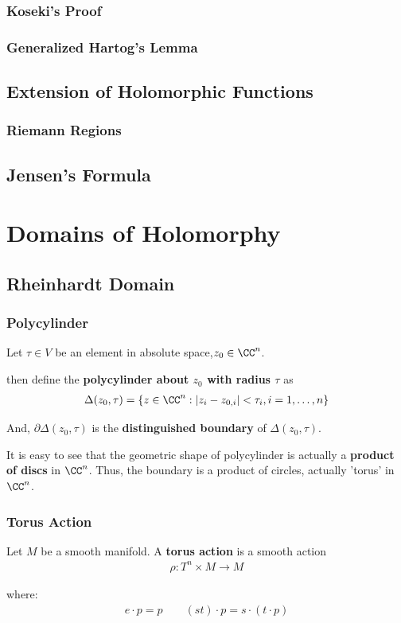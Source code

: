 \documentclass[Total.tex]{subfiles}
\begin{document}
		\subsubsection{Koseki's Proof}
		\subsubsection{Generalized Hartog's Lemma}
		
		\subsection{Extension of Holomorphic Functions}
			\subsubsection{Riemann Regions}
		
		
		
		\subsection{Jensen's Formula}
		\section{Domains of Holomorphy}
		
		\subsection{Rheinhardt Domain}
		\subsubsection{Polycylinder}
		\begin{Def}
			Let	$\tau\in V$ be an element in absolute space,$z_0\in \CC^n$.
			
			then define the \textbf{polycylinder about $z_0$ with radius $\tau$} as
			\begin{gather*}
				\Delta(z_0,\tau)=\{z\in \CC^n:|z_i-z_{0,i}|<\tau_i, i=1,\dots,n\}
			\end{gather*}
			
			And, $\partial \Delta(z_0,\tau)$ is the \textbf{distinguished boundary} of $\Delta(z_0,\tau)$.
		\end{Def}
		
		It is easy to see that the geometric shape of polycylinder is actually a \textbf{product of discs} in $\CC^n$. Thus, the boundary is a product of circles, actually 'torus' in $\CC^n$.
		\subsubsection{Torus Action}
		\begin{Def}
			Let $M$ be a smooth manifold. A \textbf{torus action} is a smooth action
			\begin{gather*}
				\rho:T^n\times M\rightarrow M
			\end{gather*}
			
			where: 
			\begin{gather*}
				e\cdot p=p\qquad (st)\cdot p=s\cdot (t\cdot p)
			\end{gather*}
		\end{Def}
		
\end{document}
